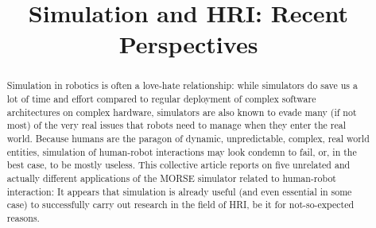 \documentclass[conference]{IEEEtran}
\begin{document}
\title{Simulation and HRI: Recent Perspectives}

\author{}


\maketitle

\begin{abstract}

Simulation in robotics is often a love-hate relationship: while simulators do
save us a lot of time and effort compared to regular deployment of complex
software architectures on complex hardware, simulators are also known to evade
many (if not most) of the very real issues that robots need to manage when they
enter the real world.  Because humans are the paragon of dynamic, unpredictable,
complex, real world entities, simulation of human-robot interactions may look
condemn to fail, or, in the best case, to be mostly useless.  This collective
article reports on five unrelated and actually different applications of the
MORSE simulator related to human-robot interaction: It appears that simulation
is already useful (and even essential in some case) to successfully carry out
research in the field of HRI, be it for not-so-expected reasons.

\end{abstract}
\end{document}
